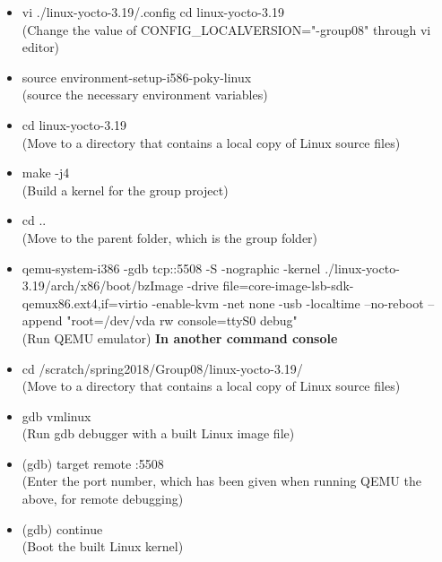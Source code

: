 \documentclass[journal,onecolumn]{IEEEtran}
\begin{document}
\begin{itemize}
\item vi ./linux-yocto-3.19/.config cd linux-yocto-3.19		
								\\(Change the value of CONFIG\_LOCALVERSION="-group08" through vi editor)
\item source environment-setup-i586-poky-linux
								\\(source the necessary environment variables)
\item cd linux-yocto-3.19
								\\(Move to a directory that contains a local copy of Linux source files)
\item make -j4		
								\\(Build a kernel for the group project)
\item cd ..
								\\(Move to the parent folder, which is the group folder)
\item qemu-system-i386 -gdb tcp::5508 -S -nographic -kernel ./linux-yocto-3.19/arch/x86/boot/bzImage -drive file=core-image-lsb-sdk-qemux86.ext4,if=virtio -enable-kvm -net none -usb -localtime --no-reboot --append "root=/dev/vda rw console=ttyS0 debug"
								\\(Run QEMU emulator)
\newline
\newline
\textbf{In another command console}
\newline
\item cd /scratch/spring2018/Group08/linux-yocto-3.19/
								\\(Move to a directory that contains a local copy of Linux source files)
\item gdb vmlinux
								\\(Run gdb debugger with a built Linux image file)
\item (gdb) target remote :5508
								\\(Enter the port number, which has been given when running QEMU the above, for remote debugging)
\item (gdb) continue
								\\(Boot the built Linux kernel)
\end{itemize}



\newpage
\end{document}
